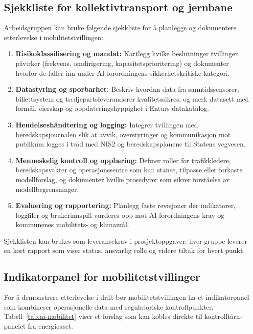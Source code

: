 \subsection{Sjekkliste for kollektivtransport og jernbane}
Arbeidsgruppen kan bruke følgende sjekkliste for å planlegge og dokumentere etterlevelse i mobilitetstvillingen:
\begin{enumerate}
    \item \textbf{Risikoklassifisering og mandat:} Kartlegg hvilke beslutninger tvillingen påvirker (frekvens, omdirigering, kapasitetsprioritering) og dokumenter hvorfor de faller inn under AI-forordningens sikkerhetskritiske kategori.\citep{eu2024aiact,banenor2024digitalspor}
    \item \textbf{Datastyring og sporbarhet:} Beskriv hvordan data fra sanntidssensorer, billettsystem og tredjepartsleverandører kvalitetssikres, og merk datasett med formål, eierskap og oppdateringshyppighet i Enturs datakatalog.\citep{entur2023dataplattform}
    \item \textbf{Hendelseshåndtering og logging:} Integrer tvillingen med beredskapsjournalen slik at avvik, overstyringer og kommunikasjon mot publikum logges i tråd med NIS2 og beredskapsplanene til Statens vegvesen.\citep{vegvesen2023beredskap}
    \item \textbf{Menneskelig kontroll og opplæring:} Definer roller for trafikkledere, beredskapsvakter og operasjonssentre som kan stanse, tilpasse eller forkaste modellforslag, og dokumenter hvilke prosedyrer som sikrer forståelse av modellbegrensninger.\citep{ruter2024mobilitetslab}
    \item \textbf{Evaluering og rapportering:} Planlegg faste revisjoner der indikatorer, loggfiler og brukerinnspill vurderes opp mot AI-forordningens krav og kommunenes mobilitets- og klimamål.\citep{eu2024aiact,vegvesen2023beredskap}
\end{enumerate}

Sjekklisten kan brukes som leveransekrav i prosjektoppgaver: hver gruppe leverer en kort rapport som viser status, ansvarlig rolle og videre tiltak for hvert punkt.

\subsection{Indikatorpanel for mobilitetstvillinger}
For å demonstrere etterlevelse i drift bør mobilitetstvillingen ha et indikatorpanel som kombinerer operasjonelle data med regulatoriske kontrollpunkter. Tabell~\ref{tab:ai-mobilitet} viser et forslag som kan kobles direkte til kontrolltårn-panelet fra energicaset.

